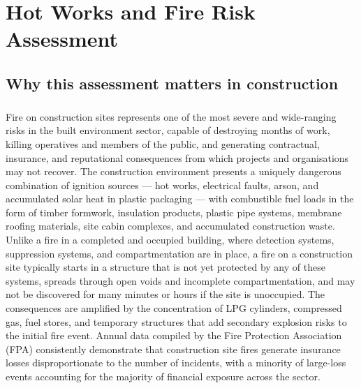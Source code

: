 \chapter{Hot Works and Fire Risk Assessment}
\label{chap:Hot Works and Fire Risk Assessment}

\section{Why this assessment matters in construction}

\paragraph{}
Fire on construction sites represents one of the most severe and wide-ranging risks in the built environment sector, capable of destroying months of work, killing operatives and members of the public, and generating contractual, insurance, and reputational consequences from which projects and organisations may not recover. The construction environment presents a uniquely dangerous combination of ignition sources --- hot works, electrical faults, arson, and accumulated solar heat in plastic packaging --- with combustible fuel loads in the form of timber formwork, insulation products, plastic pipe systems, membrane roofing materials, site cabin complexes, and accumulated construction waste. Unlike a fire in a completed and occupied building, where detection systems, suppression systems, and compartmentation are in place, a fire on a construction site typically starts in a structure that is not yet protected by any of these systems, spreads through open voids and incomplete compartmentation, and may not be discovered for many minutes or hours if the site is unoccupied. The consequences are amplified by the concentration of LPG cylinders, compressed gas, fuel stores, and temporary structures that add secondary explosion risks to the initial fire event. Annual data compiled by the Fire Protection Association (FPA) consistently demonstrate that construction site fires generate insurance losses disproportionate to the number of incidents, with a minority of large-loss events accounting for the majority of financial exposure across the sector.

